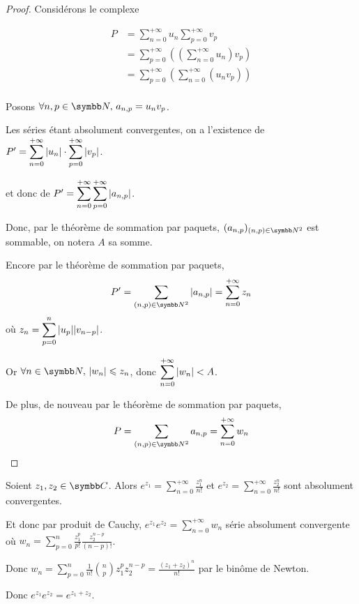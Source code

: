 
\begin{proof}
    Considérons le complexe 

    \begin{align*}
        P & = \sum_{n = 0 }^{+\infty} u_n \sum_{p = 0 }^{+\infty} v_p \\
            & = \sum_{p = 0 }^{+\infty} \left( \left( \sum_{n = 0}^{+\infty} u_n \right) v_p \right) \\
            & = \sum_{p = 0 }^{+\infty} \left( \sum_{n = 0}^{+\infty} (u_n v_p) \right) \\ 
    \end{align*}

    Posons $\forall n, p \in \N, \, a_{n, p} = u_n v_p$.

    Les séries étant absolument convergentes, on a l'existence de 
    $P' = \displaystyle \sum_{n = 0 }^{+\infty} |u_n| \cdot \sum_{p = 0 }^{+\infty} |v_p|$.

    et donc de $P' = \displaystyle \sum_{n = 0 }^{+\infty} \sum_{p = 0 }^{+\infty} |a_{n, p}|$.

    Donc, par le théorème de sommation par paquets, $(a_{n, p})_{(n, p) \in \N^2}$ est sommable, on notera $A$ sa somme. 

    Encore par le théorème de sommation par paquets, 
    \[P' = \sum_{(n, p) \in \N^2} |a_{n, p}| = \sum_{n = 0 }^{+\infty} z_n\]
    où $\displaystyle z_n = \sum_{p = 0}^n |u_p| |v_{n - p}|$.

    Or $\forall n \in \N, \, |w_n| \leqslant z_n$, donc $\displaystyle \sum_{n = 0 }^{+\infty} |w_n| < A$. 

    De plus, de nouveau par le théorème de sommation par paquets,
    \[P = \sum_{(n, p) \in \N^2} a_{n, p} = \sum_{n = 0 }^{+\infty} w_n\]
\end{proof}

\begin{exemple}
    Soient $z_1, z_2 \in \C$. Alors 
    $\displaystyle e^{z_1} = \sum_{n = 0 }^{+\infty} \frac{z_1^n}{n!}$ et
    $\displaystyle e^{z_2} = \sum_{n = 0 }^{+\infty} \frac{z_2^n}{n!}$ sont absolument convergentes.

    Et donc par produit de Cauchy, $\displaystyle e^{z_1} e^{z_2} = \sum_{n = 0 }^{+\infty} w_n$ 
    série absolument convergente où $\displaystyle w_n = \sum_{ p = 0}^n \frac{z_1^p}{p!} \frac{z_2^{n - p}}{(n - p)!}$.

    Donc $w_n = \displaystyle \sum_{p = 0 }^{n } \frac{1}{n!} \binom n p z_1^p z_2^{n - p} = \frac{(z_1 + z_2)^n}{n!}$ 
    par le binôme de Newton.

    Donc $\displaystyle e^{z_1} e^{z_2} = e^{z_1 + z_2}$.
\end{exemple}

